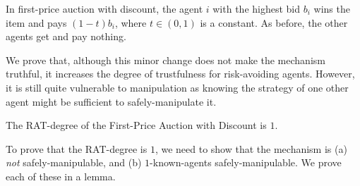 In first-price auction with discount, the agent $i$ with the highest bid $b_i$ wins the item and pays $(1-t)b_i$, where $t\in(0,1)$ is a constant. As before, the other agents get and pay nothing. 



We prove that, although this minor change does not make the  mechanism truthful, it increases the degree of trustfulness for risk-avoiding agents. 
However, it is still quite vulnerable to manipulation as knowing the strategy of one other agent might be sufficient to safely-manipulate it.

\begin{theorem}
\label{auction-with-discount}
The RAT-degree of the First-Price Auction with Discount is $1$.
\end{theorem}


To prove that the RAT-degree is $1$, we need to show that the mechanism is (a) \emph{not} safely-manipulable, and (b) 
$1$-known-agents safely-manipulable.
We prove each of these in a lemma.

